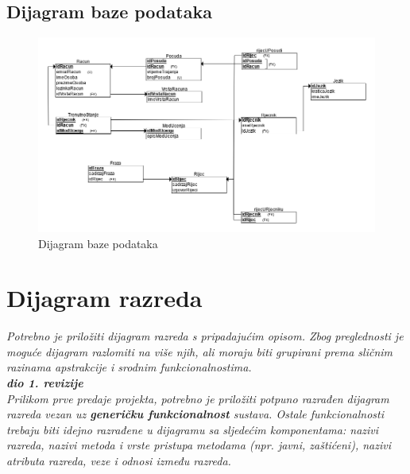 				
			
			\subsection{Dijagram baze podataka}
			

				\begin{figure}[H]
					\includegraphics[width=\textwidth]{slike/dijagramBP.PNG}
					\caption{Dijagram baze podataka}
					\label{fig:dijagramBP}
				\end{figure}
			
			
		\section{Dijagram razreda}
		
			\textit{Potrebno je priložiti dijagram razreda s pripadajućim opisom. Zbog preglednosti je moguće dijagram razlomiti na više njih, ali moraju biti grupirani prema sličnim razinama apstrakcije i srodnim funkcionalnostima.}\\
			
			\textbf{\textit{dio 1. revizije}}\\
			
			\textit{Prilikom prve predaje projekta, potrebno je priložiti potpuno razrađen dijagram razreda vezan uz \textbf{generičku funkcionalnost} sustava. Ostale funkcionalnosti trebaju biti idejno razrađene u dijagramu sa sljedećim komponentama: nazivi razreda, nazivi metoda i vrste pristupa metodama (npr. javni, zaštićeni), nazivi atributa razreda, veze i odnosi između razreda.}\\
			
